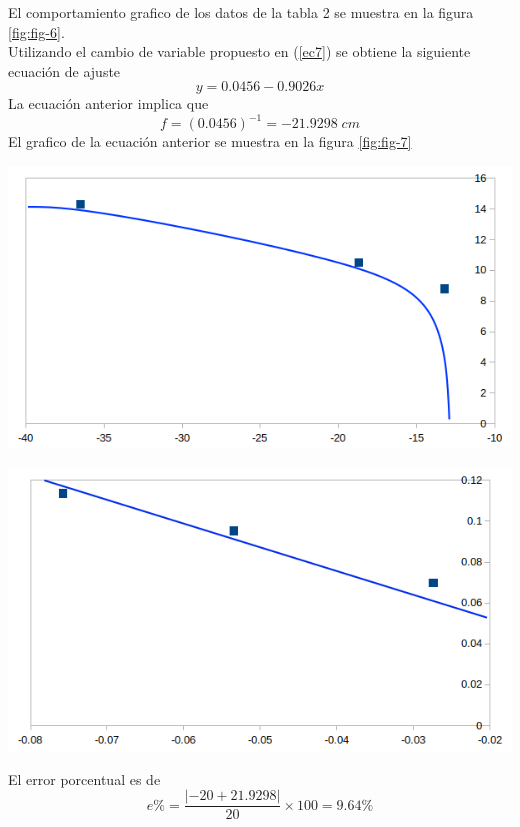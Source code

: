 \documentclass[13,twocolumn,letterpaper]{article}
\newenvironment{Figure}{\par\medskip\noindent\minipage{\linewidth}}{\endminipage\par\medskip}
\begin{document}
\begin{multicols}{2}
	
	
	El comportamiento grafico de los datos de la tabla 2 se muestra en la figura \ref{fig:fig-6}.  \\
	Utilizando el cambio de variable propuesto en (\ref{ec7}) se obtiene la siguiente ecuación de ajuste
	\begin{equation}
	y=0.0456-0.9026x
	\end{equation}
	La ecuación anterior implica que 
	$$f=(0.0456)^{-1}=-21.9298\;cm$$
	El grafico de la ecuación anterior se muestra en la figura \ref{fig:fig-7}
	\begin{Figure}
		\centering
		\includegraphics[width=\linewidth]{fig6}
		\label{fig:fig-6}
	\end{Figure}
	\begin{Figure}
		\centering
		\includegraphics[width=\linewidth]{fig7}
		\label{fig:fig-7}
	\end{Figure}
	El error porcentual es de 
	$$e\%=\dfrac{|-20+21.9298|}{20}\times 100 =9.64 \%$$
	

\end{multicols}
\end{document}

